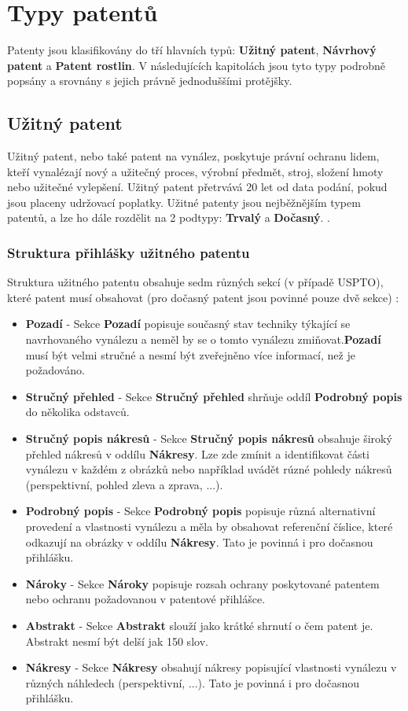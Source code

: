 \section{Typy patentů}
Patenty jsou klasifikovány do tří hlavních typů: \textbf{Užitný patent}, \textbf{Návrhový patent} a \textbf{Patent rostlin}. V následujících kapitolách jsou tyto typy podrobně popsány a srovnány s jejich právně jednoduššími protějšky.

\subsection{Užitný patent}
Užitný patent, nebo také patent na vynález, poskytuje právní ochranu lidem, kteří vynalézají nový a užitečný proces, výrobní předmět, stroj, složení hmoty nebo užitečné vylepšení. Užitný patent přetrvává 20 let od data podání, pokud jsou placeny udržovací poplatky. Užitné patenty jsou nejběžnějším typem patentů, a lze ho dále rozdělit na 2 podtypy: \textbf{Trvalý} a \textbf{Dočasný}. \cite{usptoUtilityPatent, patentIntroduction}.

\subsubsection{Struktura přihlášky užitného patentu} \label{sec:utility_structure}
Struktura užitného patentu obsahuje sedm různých sekcí (v případě \gls{USPTO}), které patent musí obsahovat (pro dočasný patent jsou povinné pouze dvě sekce) \cite{utilityStructure}:
\begin{itemize}
\item \textbf{Pozadí} - Sekce \textbf{Pozadí} popisuje současný stav techniky týkající se navrhovaného vynálezu a neměl by se o tomto vynálezu zmiňovat.\textbf{Pozadí} musí být velmi stručné a nesmí být zveřejněno více informací, než je požadováno.
\item \textbf{Stručný přehled} - Sekce \textbf{Stručný přehled} shrňuje oddíl \textbf{Podrobný popis} do několika odstavců.
\item \textbf{Stručný popis nákresů} - Sekce \textbf{Stručný popis nákresů} obsahuje široký přehled nákresů v oddílu \textbf{Nákresy}. Lze zde zmínit a identifikovat části vynálezu v každém z obrázků nebo například uvádět rúzné pohledy nákresů (perspektivní, pohled zleva a zprava, ...).
\item \textbf{Podrobný popis} - Sekce \textbf{Podrobný popis} popisuje různá alternativní provedení a vlastnosti vynálezu a měla by obsahovat referenční číslice, které odkazují na obrázky v oddílu \textbf{Nákresy}. Tato je povinná i pro dočasnou přihlášku.
\item \textbf{Nároky} - Sekce \textbf{Nároky} popisuje rozsah ochrany poskytované patentem nebo ochranu požadovanou v patentové přihlášce.
\item \textbf{Abstrakt} - Sekce \textbf{Abstrakt} slouží jako krátké shrnutí o čem patent je. Abstrakt nesmí být delší jak 150 slov.
\item \textbf{Nákresy} - Sekce \textbf{Nákresy} obsahují nákresy popisující vlastnosti vynálezu v různých náhledech (perspektivní, ...).  Tato je povinná i pro dočasnou přihlášku.
\end{itemize}

